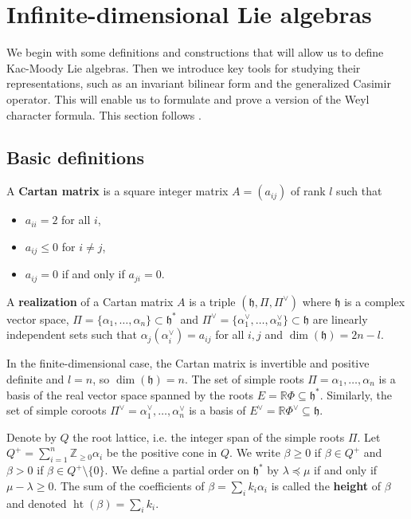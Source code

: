 \documentclass[12pt]{article}
\begin{document}
\section{Infinite-dimensional Lie algebras}
We begin with some definitions and constructions that will allow us to define Kac-Moody Lie algebras. Then we introduce key tools for studying their representations, such as an invariant bilinear form and the generalized Casimir operator. This will enable us to formulate and prove a version of the Weyl character formula.
This section follows \cite{kac}.
\subsection{Basic definitions}
\begin{definition}
    A \textbf{Cartan matrix} is a square integer matrix $A = (a_{ij})$ of rank $l$ such that
    \begin{itemize}
        \item $a_{ii} = 2$ for all $i$,
        \item $a_{ij} \leq 0$ for $i \neq j$,
        \item $a_{ij} = 0$ if and only if $a_{ji} = 0$.
    \end{itemize}
    A \textbf{realization} of a Cartan matrix $A$ is a triple $(\mathfrak{h}, \Pi, \Pi^\vee)$ where $\mathfrak{h}$ is a complex vector space, $\Pi = \{\alpha_1, \dots, \alpha_n\} \subset \mathfrak{h}^*$ and $\Pi^\vee = \{\alpha_1^\vee, \dots, \alpha_n^\vee\} \subset \mathfrak{h}$ are linearly independent sets such that $\alpha_j(\alpha_i^\vee) = a_{ij}$ for all $i,j$ and $\dim(\mathfrak{h}) = 2n - l$.
\end{definition}

\begin{remark}
    In the finite-dimensional case, the Cartan matrix is invertible and positive definite and $l = n$, so $\dim(\mathfrak{h}) = n$. The set of simple roots $\Pi = {\alpha_1, \dots, \alpha_n}$ is a basis of the real vector space spanned by the roots $E = \mathbb{R}\Phi \subseteq \mathfrak{h}^*$. Similarly, the set of simple coroots $\Pi^\vee = {\alpha_1^\vee, \dots, \alpha_n^\vee}$ is a basis of $E^\vee = \mathbb{R}\Phi^\vee \subseteq \mathfrak{h}$.
\end{remark}

Denote by $Q$ the root lattice, i.e. the integer span of the simple roots $\Pi$. Let $Q^+ = \sum_{i=1}^n \mathbb{Z}_{\geq 0} \alpha_i$ be the positive cone in $Q$. We write $\beta \geq 0$ if $\beta \in Q^+$ and $\beta > 0$ if $\beta \in Q^+ \setminus \{0\}$. We define a partial order on $\mathfrak{h}^*$ by $\lambda \preceq \mu$ if and only if $\mu - \lambda \geq 0$. The sum of the coefficients of $\beta = \sum_i k_i \alpha_i$ is called the \textbf{height} of $\beta$ and denoted $\operatorname{ht}(\beta) = \sum_i k_i$.
\end{document}
